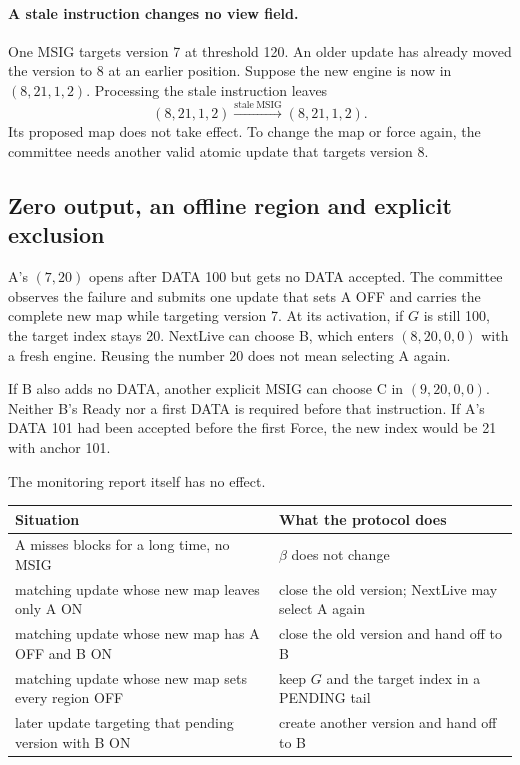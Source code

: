 \documentclass[11pt,a4paper]{article}
\newcounter{protocol}
\begin{document}
\paragraph{A stale instruction changes no view field.}
One MSIG targets version 7 at threshold 120. An older update has already
moved the version to 8 at an earlier position. Suppose the new
engine is now in $(8,21,1,2)$. Processing the stale instruction leaves
\[
 (8,21,1,2)\xrightarrow{\mathrm{stale\ MSIG}}(8,21,1,2).
\]
Its proposed map does not take effect. To change the map or force again,
the committee needs another valid atomic update that targets version 8.

\subsection{Zero output, an offline region and explicit exclusion}
\label{sec:retry-example}
A's $(7,20)$ opens after DATA 100 but gets no DATA accepted. The committee
observes the failure and submits one update that sets A OFF and carries
the complete new map while targeting version 7. At its activation, if
$G$ is still 100, the target index stays 20. NextLive can choose B, which
enters $(8,20,0,0)$ with a fresh engine. Reusing the number 20 does not
mean selecting A again.

If B also adds no DATA, another explicit MSIG can choose C in
$(9,20,0,0)$. Neither B's Ready nor a first DATA is required before that
instruction. If A's DATA 101 had been accepted before the first Force,
the new index would be 21 with anchor 101.

The monitoring report itself has no effect.
\begin{center}\small
\begin{tabularx}{\linewidth}{@{}>{\raggedright\arraybackslash}p{.45\linewidth}Y@{}}\toprule
Situation & What the protocol does\\\midrule
A misses blocks for a long time, no MSIG & $\beta$ does not change\\
matching update whose new map leaves only A ON & close the old version; NextLive may select A again\\
matching update whose new map has A OFF and B ON & close the old version and hand off to B\\
matching update whose new map sets every region OFF & keep $G$ and the target index in a PENDING tail\\
later update targeting that pending version with B ON & create another version and hand off to B\\\bottomrule
\end{tabularx}
\end{center}
\end{document}

